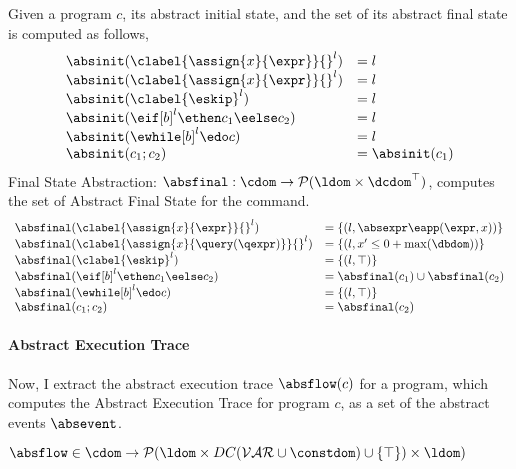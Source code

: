 %
Given a program $c$, its abstract initial state,
and the set of its abstract final state is computed as follows,
%
\[
  \begin{array}{ll}
    \absinit(\clabel{\assign{x}{\expr}}{}^l)  & = l  \\
    \absinit(\clabel{\assign{x}{\expr}}{}^l)  & = l \\
    \absinit(\clabel{\eskip}^{l})  & = l \\
    \absinit(\eif [b]^l \ethen c_1 \eelse c_2)  & = l \\
    \absinit(\ewhile [b]^l \edo c)  & = l \\
    \absinit(c_1 ; c_2)  & = \absinit(c_1) \\
 \end{array}
 \]
%
Final State Abstraction: 
$\absfinal: \cdom \to \mathcal{P}(\ldom \times \dcdom^{\top})$,
computes the set of Abstract Final State for the command. 
 \[
  \begin{array}{ll}
    \absfinal(\clabel{\assign{x}{\expr}}{}^l)  & = \{(l, \absexpr\eapp (\expr, x))\}  \\
     \absfinal(\clabel{\assign{x}{\query(\qexpr)}}{}^l)  & = \{
      (l, x' \leq 0 + \max(\dbdom) )\}  \\
     \absfinal(\clabel{\eskip}^{l})  
     & = \{(l, \top)\} \\
     \absfinal(\eif [b]^l \ethen c_1 \eelse c_2)  & = \absfinal(c_1) \cup \absfinal(c_2) \\
     \absfinal(\ewhile [b]^l \edo c)  & = \{(l, \top)\} \\
     \absfinal(c_1 ; c_2)  & =  \absfinal(c_2) \\
 \end{array}
 \]
 \paragraph{Abstract Execution Trace}
 Now, I  extract the abstract execution trace  $\absflow(c)$ for a program, which computes the Abstract Execution Trace for program $c$, as a set of the abstract events $\absevent$.
 \begin{defn}
 \label{def:abs_trace}
  $\absflow \in \cdom \to \mathcal{P}( \ldom \times DC(\mathcal{VAR}  \cup \constdom) \cup \{\top\}) \times \ldom )$
  \end{defn}

